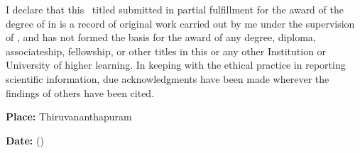 I declare that this \Doctype \ titled \textbf{\Title} submitted in 
partial fulfillment for the award of the degree of {\bf\Degreetext} 
in {\bf\Specialization} is a record of original work carried out by 
me under the supervision of {\bf\Advisor}, and has not formed the 
basis for the award of any degree, diploma, associateship, 
fellowship, or other titles in this or any other Institution or 
University of higher learning. In keeping with the ethical practice 
in reporting scientific information, due acknowledgments have been 
made wherever the findings of others have been cited.

\vspace{15mm}

\noindent\textbf{Place: }Thiruvananthapuram\hfill \Author \hspace{5mm}

\noindent\textbf{Date: }\Date \hfill (\Studentid)\hspace{3mm}
